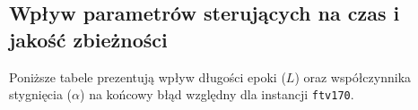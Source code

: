 \documentclass[conference]{IEEEtran}
\begin{document}
        \subsection{Wpływ parametrów sterujących na czas i jakość zbieżności}
            Poniższe tabele prezentują wpływ długości epoki ($L$) oraz współczynnika stygnięcia ($\alpha$) na końcowy błąd względny dla instancji \texttt{ftv170}.
            \begin{table}[H]
                \centering
                \caption{Wpływ długości epoki (ftv170, Insert, Geom., $\alpha=0.95$, $T_{start}=85500$)}
                \label{tab:wplyw_epoki}
            \end{table}
            \begin{table}[H]
                \centering
                \caption{Wpływ wsp. stygnięcia (ftv170, Insert, Geom., $T_{start}=855000$, $L=100 \cdot N$)}
                \label{tab:wplyw_alfy}
            \end{table}
\end{document}

